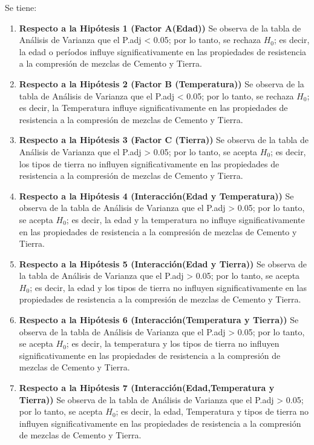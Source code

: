 \documentclass[12pt,letterpaper]{report}
\begin{document}
Se tiene:
\begin{enumerate}

\item {\textbf{Respecto a la Hipótesis 1 (Factor A(Edad))}}
Se observa de la tabla de Análisis de Varianza que el P.adj < 0.05; por lo tanto,
se rechaza $H_0$; es decir, la edad o períodos influye significativamente en las propiedades de
resistencia a la compresión de mezclas de Cemento y Tierra.

\item {\textbf{Respecto a la Hipótesis 2 (Factor B (Temperatura))}}
Se observa de la tabla de Análisis de Varianza que el P.adj < 0.05; por lo tanto,
se rechaza $H_0$; es decir, la Temperatura influye significativamente en las propiedades de
resistencia a la compresión de mezclas de Cemento y Tierra.

\item {\textbf{Respecto a la Hipótesis 3 (Factor C (Tierra))}}
Se observa de la tabla de Análisis de Varianza que el P.adj > 0.05; por lo tanto, se
acepta $H_0$; es decir, los tipos de tierra no influyen significativamente en las propiedades de
resistencia a la compresión de mezclas de Cemento y Tierra.

\item {\textbf{Respecto a la Hipótesis 4 (Interacción(Edad y Temperatura))}}
Se observa de la tabla de Análisis de Varianza que el P.adj > 0.05; por lo tanto, se
acepta $H_0$; es decir, la edad y la temperatura no influye significativamente en las propiedades
de resistencia a la compresión de mezclas de Cemento y Tierra.

\item {\textbf{Respecto a la Hipótesis 5 (Interacción(Edad y Tierra))}}
Se observa de la tabla de Análisis de Varianza que el P.adj > 0.05; por lo tanto, se
acepta $H_0$; es decir, la edad y los tipos de tierra no influyen significativamente en las
propiedades de resistencia a la compresión de mezclas de Cemento y Tierra.

\item {\textbf{Respecto a la Hipótesis 6 (Interacción(Temperatura y Tierra))}}
Se observa de la tabla de Análisis de Varianza que el P.adj > 0.05; por lo tanto, se
acepta $H_0$; es decir, la temperatura y los tipos de tierra no influyen significativamente en las
propiedades de resistencia a la compresión de mezclas de Cemento y Tierra.

\item {\textbf{Respecto a la Hipótesis 7 (Interacción(Edad,Temperatura y Tierra))}}
Se observa de la tabla de Análisis de Varianza que el P.adj > 0.05; por lo tanto, se
acepta $H_0$; es decir, la edad, Temperatura y tipos de tierra no influyen significativamente en
las propiedades de resistencia a la compresión de mezclas de Cemento y Tierra.

\end{enumerate}
\end{document}
